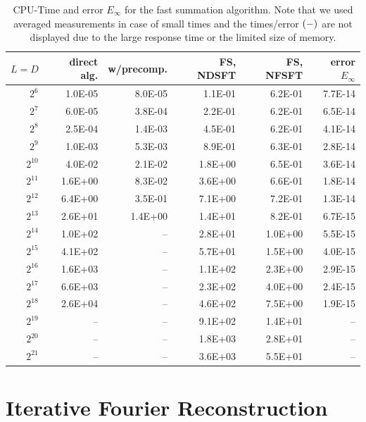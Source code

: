 \begin{table}[ht!]
  \begin{center}
    \begin{tabular}{r|r|r|r|r|r}
        $L = D$ & direct alg. & w/precomp. & FS, NDSFT & FS, NFSFT & error $E_{\infty}$\\\hline
           $2^6$ & 1.0E-05 & 8.0E-05 & 1.1E-01 & 6.2E-01 & 7.7E-14\\
           $2^7$ & 6.0E-05 & 3.8E-04 & 2.2E-01 & 6.2E-01 & 6.5E-14\\
           $2^8$ & 2.5E-04 & 1.4E-03 & 4.5E-01 & 6.2E-01 & 4.1E-14\\
           $2^9$ & 1.0E-03 & 5.3E-03 & 8.9E-01 & 6.3E-01 & 2.8E-14\\
      $2^{10}$ & 4.0E-02 & 2.1E-02 & 1.8E+00 & 6.5E-01 & 3.6E-14\\
      $2^{11}$ & 1.6E+00 & 8.3E-02 & 3.6E+00 & 6.6E-01 & 1.8E-14\\
      $2^{12}$ & 6.4E+00 & 3.5E-01 & 7.1E+00 & 7.2E-01 & 1.3E-14\\
      $2^{13}$ & 2.6E+01 & 1.4E+00 & 1.4E+01 & 8.2E-01 & 6.7E-15\\
     $2^{14}$ & 1.0E+02 & -- & 2.8E+01 & 1.0E+00 & 5.5E-15\\
     $2^{15}$ & 4.1E+02 & -- & 5.7E+01 & 1.5E+00 & 4.0E-15\\
     $2^{16}$ & 1.6E+03 & -- & 1.1E+02 & 2.3E+00 & 2.9E-15\\
     $2^{17}$ & 6.6E+03 & -- & 2.3E+02 & 4.0E+00 & 2.4E-15\\
     $2^{18}$ & 2.6E+04 & -- & 4.6E+02 & 7.5E+00 & 1.9E-15\\
     $2^{19}$ & -- & -- & 9.1E+02 & 1.4E+01 & --\\
     $2^{20}$ & -- & -- & 1.8E+03 & 2.8E+01 & --\\
     $2^{21}$ & -- & -- & 3.6E+03 & 5.5E+01 & --\\
    \end{tabular}
  \end{center}
  \caption{CPU-Time and error $E_{\infty}$ for the fast summation algorithm.
    Note that we used averaged measurements in case of small times and the
    times/error $\left(-\right)$ are not displayed due to the large response time or the 
    limited size of memory.}
  \label{tab:TimeSpace}
\end{table}


\section{Iterative Fourier Reconstruction}

